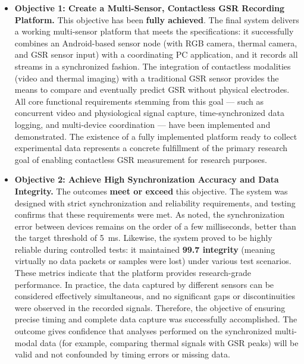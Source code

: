 \begin{itemize}
\item \textbf{Objective 1: Create a Multi-Sensor, Contactless GSR Recording
  Platform.} This objective has been \textbf{fully achieved}. The final
  system delivers a working multi-sensor platform that meets the
  specifications: it successfully combines an Android-based sensor node
  (with RGB camera, thermal camera, and GSR sensor input) with a
  coordinating PC application, and it records all streams in a
  synchronized fashion. The integration of contactless modalities (video
  and thermal imaging) with a traditional GSR sensor provides the means
  to compare and eventually predict GSR without physical electrodes. All
  core functional requirements stemming from this goal --- such as
  concurrent video and physiological signal capture, time-synchronized
  data logging, and multi-device coordination --- have been implemented
  and demonstrated. The existence of a fully implemented platform ready
  to collect experimental data represents a concrete fulfillment of the
  primary research goal of enabling contactless GSR measurement for
  research purposes.

\item \textbf{Objective 2: Achieve High Synchronization Accuracy and Data
  Integrity.} The outcomes \textbf{meet or exceed} this objective. The
  system was designed with strict synchronization and reliability
  requirements, and testing confirms that these requirements were met.
  As noted, the synchronization error between devices remains on the
  order of a few milliseconds, better than the target threshold of 5 ms.
  Likewise, the system proved to be highly reliable during controlled
  tests: it maintained \textbf{99.7%
  integrity} (meaning virtually no data packets or samples were lost)
  under various test
  scenarios\cite{AppleHealthWatch2019}.
  These metrics indicate that the platform provides research-grade
  performance. In practice, the data captured by different sensors can
  be considered effectively simultaneous, and no significant gaps or
  discontinuities were observed in the recorded signals. Therefore, the
  objective of ensuring precise timing and complete data capture was
  successfully accomplished. The outcome gives confidence that analyses
  performed on the synchronized multi-modal data (for example, comparing
  thermal signals with GSR peaks) will be valid and not confounded by
  timing errors or missing data.


\end{itemize}

